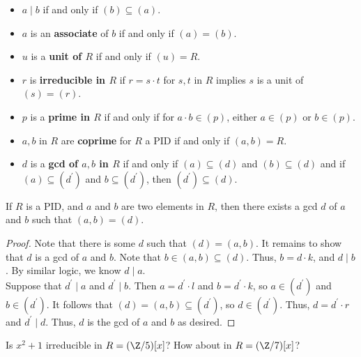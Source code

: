 \documentclass[11pt]{article}
\begin{document}
\begin{definition}
    \hfill
    \vspace{-0.25cm}
    \begin{itemize}
        \item $a \mid b$ if and only if $(b) \subseteq (a)$.
        \item $a$ is an \textbf{associate} of $b$ if and only if $(a) = (b)$.
        \item $u$ is a \textbf{unit of $R$} if and only if $(u) = R$.
        \item $r$ is \textbf{irreducible in $R$} if $r = s \cdot t$ for $s, t$ in $R$ implies $s$ is a unit of $(s) = (r)$.
        \item $p$ is a \textbf{prime in $R$} if and only if for $a \cdot b \in (p)$, either $a \in (p)$ or $b \in (p)$.
        \item $a, b$ in $R$ are \textbf{coprime} for $R$ a PID if and only if $(a, b) = R$.
        \item $d$ is a \textbf{gcd of $a, b$ in $R$} if and only if $(a) \subseteq  (d)$ and $(b) \subseteq (d)$ and 
        if $(a) \subseteq (d^{\prime})$ and $b \subseteq (d^{\prime})$, then $(d^{\prime}) \subseteq (d)$.
    \end{itemize}
\end{definition}

\begin{lemma}
If $R$ is a PID, and $a$ and $b$ are two elements in $R$, then there exists a gcd $d$ of $a$ and $b$ such that $(a, b) = (d).$
\end{lemma}

\begin{proof}
Note that there is some $d$ such that $(d) = (a, b)$. It remains to show that $d$ is a gcd of $a$ and $b$. Note that $b \in (a, b) \subseteq (d)$. Thus, $b = d\cdot k$, and $d \mid b$. 
By similar logic, we know $d \mid a$. \\

Suppose that $d^{\prime}  \mid a$ and $d^{\prime} \mid b$. Then $a = d^{\prime} \cdot l$ and $b = d^{\prime} \cdot k$, so $a \in (d^{\prime})$ and $b \in (d^{\prime}).$
It follows that $(d) = (a, b) \subseteq (d^{\prime})$, so $d \in (d^{\prime}).$ Thus, $d = d^{\prime} \cdot r$ and $d^{\prime} \mid d$.
Thus, $d$ is the gcd of $a$ and $b$ as desired.
\end{proof}

\begin{exercise}
Is $x^2 + 1$ irreducible in $R = (\Z / 5)[x]$? How about in $R = (\Z / 7)[x]$?
\end{exercise}
\end{document}

